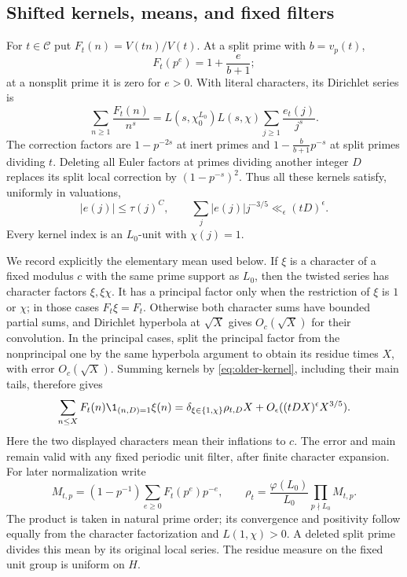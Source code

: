 \subsection{Shifted kernels, means, and fixed filters}

For \(t\in\mathcal C\) put \(F_t(n)=V(tn)/V(t)\).
At a split prime with \(b=v_p(t)\),
\[
 F_t(p^e)=1+\frac{e}{b+1};
\]
at a nonsplit prime it is zero for \(e>0\).
With literal characters, its Dirichlet series is
\[
 \sum_{n\ge1}\frac{F_t(n)}{n^s}
   =L(s,\chi_0^{L_0})L(s,\chi)\sum_{j\ge1}\frac{e_t(j)}{j^s}.
\]
The correction factors are \(1-p^{-2s}\) at inert primes and
\(1-\frac{b}{b+1}p^{-s}\) at split primes dividing \(t\).
Deleting all Euler factors at primes dividing another integer \(D\)
replaces its split local correction by \((1-p^{-s})^2\).
Thus all these kernels satisfy, uniformly in valuations,
\begin{equation}\label{eq:older-kernel}
 |e(j)|\le\tau(j)^C,\qquad
 \sum_j|e(j)|j^{-3/5}\ll_{\epsilon}(tD)^\epsilon.
\end{equation}
Every kernel index is an \(L_0\)-unit with \(\chi(j)=1\).

We record explicitly the elementary mean used below.  If
\(\xi\) is a character of a fixed modulus \(c\) with the same prime
support as \(L_0\), then the twisted series has character factors
\(\xi,\xi\chi\).
It has a principal factor only when the restriction of \(\xi\)
is \(1\) or \(\chi\); in those cases \(F_t\xi=F_t\).
Otherwise both character sums have bounded partial sums, and
Dirichlet hyperbola at \(\sqrt X\) gives \(O_c(\sqrt X)\) for
their convolution.
In the principal cases, split the principal factor from the
nonprincipal one by the same hyperbola argument to obtain its residue
times \(X\), with error \(O_c(\sqrt X)\).
Summing kernels by \eqref{eq:older-kernel}, including their main tails,
therefore gives
\begin{equation}\label{eq:older-mean}
 \sum_{n\le X}F_t(n)\1_{(n,D)=1}\xi(n)
 =\delta_{\xi\in\{1,\chi\}}\rho_{t,D}X
                         +O_\epsilon((tDX)^\epsilon X^{3/5}).
\end{equation}
Here the two displayed characters mean their inflations to \(c\).
The error and main remain valid with any fixed periodic unit filter,
after finite character expansion.
For later normalization write
\[
 M_{t,p}=(1-p^{-1})\sum_{e\ge0}F_t(p^e)p^{-e},\qquad
 \rho_t=\frac{\varphi(L_0)}{L_0}\prod_{p\nmid L_0}M_{t,p}.
\]
The product is taken in natural prime order; its convergence and
positivity follow equally from the character factorization and
\(L(1,\chi)>0\).  A deleted split prime divides this mean by its
original local series.  The residue measure on the fixed unit
group is uniform on \(H\).

